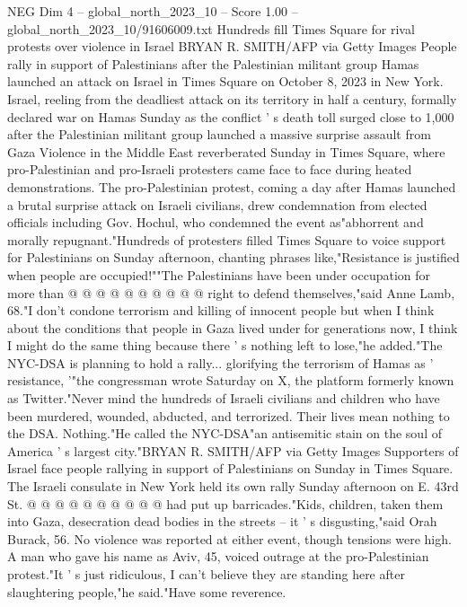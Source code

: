 \begin{textsample}{NEG Dim 4 – global\_north\_2023\_10 – Score 1.00 – global\_north\_2023\_10/91606009.txt}  \label{ex:f4_neg_003}
Hundreds fill Times Square for rival protests over violence in Israel BRYAN R.
SMITH/AFP via Getty Images People rally in support of Palestinians after the Palestinian militant group Hamas launched an attack on Israel in Times Square on October 8, 2023 in New York.
Israel, reeling from the deadliest attack on its territory in half a century, formally declared war on Hamas Sunday as the conflict ' s death toll surged close to 1,000 after the Palestinian militant group launched a massive surprise assault from Gaza Violence in the Middle East reverberated Sunday in Times Square, where pro-Palestinian and pro-Israeli protesters came face to face during heated demonstrations.
The pro-Palestinian protest, coming a day after Hamas launched a brutal surprise attack on Israeli civilians, drew condemnation from elected officials including Gov.
Hochul, who condemned the event as"abhorrent and morally repugnant."Hundreds of protesters filled Times Square to voice support for Palestinians on Sunday afternoon, chanting phrases like,"Resistance is justified when people are occupied!""The Palestinians have been under occupation for more than @ @ @ @ @ @ @ @ @ @ right to defend themselves,"said Anne Lamb, 68."I don't condone terrorism and killing of innocent people but when I think about the conditions that people in Gaza lived under for generations now, I think I might do the same thing because there ' s nothing left to lose,"he added."The NYC-DSA is planning to hold a rally... glorifying the terrorism of Hamas as ' resistance, '"the congressman wrote Saturday on X, the platform formerly known as Twitter."Never mind the hundreds of Israeli civilians and children who have been murdered, wounded, abducted, and terrorized.
Their lives mean nothing to the DSA.
Nothing."He called the NYC-DSA"an antisemitic stain on the soul of America ' s largest city."BRYAN R.
SMITH/AFP via Getty Images Supporters of Israel face people rallying in support of Palestinians on Sunday in Times Square.
The Israeli consulate in New York held its own rally Sunday afternoon on E. 43rd St. @ @ @ @ @ @ @ @ @ @ had put up barricades."Kids, children, taken them into Gaza, desecration dead bodies in the streets -- it ' s disgusting,"said Orah Burack, 56.
No violence was reported at either event, though tensions were high.
A man who gave his name as Aviv, 45, voiced outrage at the pro-Palestinian protest."It ' s just ridiculous, I can't believe they are standing here after slaughtering people,"he said."Have some reverence.

\end{textsample}
